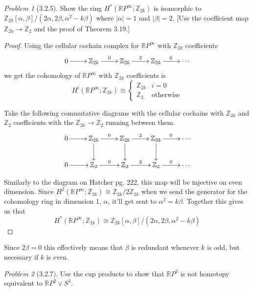 \documentclass[10pt]{article}
\newcommand{\sk}{\vskip 10mm}
\newcommand{\bb}[1]{\mathbb{#1}}
\theoremstyle{remark}
\newtheorem{problem}{Problem}
\begin{document}
\sk

\begin{problem}[3.2.5]
  Show the ring $H^*(\bb{R}P^\infty;\bb{Z}_{2k})$ is isomorphic to
  $\bb{Z}_{2k}[\alpha,\beta]/(2\alpha,2\beta,\alpha^2-k\beta)$ where
  $|\alpha|=1$ and $|\beta|=2$. [Use the coefficient map
  $\bb{Z}_{2k}\rightarrow\bb{Z}_2$ and the proof of Theorem 3.19.]
\end{problem}

\begin{proof}
  Using the cellular cochain complex for $\bb{R}P^\infty$ with $\bb{Z}_{2k}$
  coefficients
  \[
    \xymatrix{
      0 \ar[r] & \bb{Z}_{2k} \ar[r]^0 & \bb{Z}_{2k} \ar[r]^2 & \bb{Z}_{2k} \ar[r]^0 & \cdots
    }
  \]
  we get the cohomology of $\bb{R}P^\infty$ with $\bb{Z}_{2k}$ coefficients is
  \[
    H^i(\bb{R}P^\infty;\bb{Z}_{2k})\cong 
    \left\{
      \begin{array}{ll}
        \bb{Z}_{2k}& i=0\\
        \bb{Z}_{2} & \text{otherwise}
      \end{array}
    \right.
  \]

  Take the following commutative diagrams with the cellular cochains with
  $\bb{Z}_{2k}$ and $\bb{Z}_2$ coefficients with the $\bb{Z}_{2k}\rightarrow\bb{Z}_2$
  running between them.
  \[
    \xymatrix{
      0 \ar[r] & \bb{Z}_{2k} \ar[r]^0 \ar[d]& \bb{Z}_{2k} \ar[r]^2 \ar[d]& \bb{Z}_{2k} \ar[r]^0 \ar[d]& \cdots\\
      0 \ar[r] & \bb{Z}_{2} \ar[r]^0 & \bb{Z}_{2} \ar[r]^2 & \bb{Z}_{2} \ar[r]^0 & \cdots
    }
  \]

  Similarly to the diagram on Hatcher pg. 222, this map will be injective on even
  dimension. Since $H^2(\bb{R}P^\infty;\bb{Z}_{2k})\cong\bb{Z}_{2k}/2\bb{Z}_{2k}$ when we send
  the generator for the cohomology ring in dimension 1, $\alpha$, it'll get sent to
  $\alpha^2=k\beta$. Together this gives us that
  \[
    H^*(\bb{R}P^\infty;\bb{Z}_{2k})\cong \bb{Z}_{2k}[\alpha,\beta]/(2\alpha,2\beta,\alpha^2-k\beta)
  \]
\end{proof}

Since $2\beta=0$ this effectively means that $\beta$ is redundant whenever $k$ is odd,
but necessary if $k$ is even.

\sk

\begin{problem}[3.2.7]
  Use the cup products to show that $\bb{R}P^3$ is  not homotopy equivalent to
  $\bb{R}P^2\vee S^3$.
\end{problem}
\end{document}
